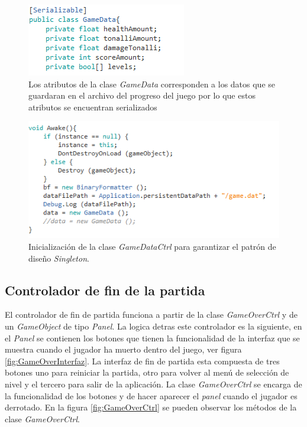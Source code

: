 	\begin{figure}[h]
		\centering
		\includegraphics[height=0.15 \textheight]{03TrabajoRealizado/imagenes/GameData.png}
		\caption{Los atributos de la clase \textit{GameData} corresponden a los 
		datos que se guardaran en el archivo del progreso del juego por lo que 
		estos atributos se encuentran serializados}
		\label{fig:GameData}
	\end{figure}   
	
	\begin{figure}[h]
		\centering
		\includegraphics[height=0.2 \textheight]{03TrabajoRealizado/imagenes/gameDataCtrl.png}
		\caption{Inicialización de la clase \textit{GameDataCtrl} para 
		garantizar el patrón de diseño \textit{Singleton}.}
		\label{fig:GameDataCtrl}
	\end{figure}

\subsection{Controlador de fin de la partida}
El controlador de fin de partida funciona a partir de la clase 
\textit{GameOverCtrl} y de un \textit{GameObject} de tipo \textit{Panel}. La 
logica detras este controlador es la siguiente, en el \textit{Panel} se 
contienen los botones que tienen la funcionalidad de la interfaz que se muestra 
cuando el jugador ha muerto dentro del juego, ver figura 
\ref{fig:GameOverInterfaz}. La interfaz de fin de partida esta compuesta de tres 
botones uno para reiniciar la partida, otro para volver al menú de selección de 
nivel y el tercero para salir de la aplicación. La clase \textit{GameOverCtrl} 
se encarga de la funcionalidad de los botones y de hacer aparecer el 
\textit{panel} cuando el jugador es derrotado. En la figura 
\ref{fig:GameOverCtrl} se pueden observar los métodos de la clase \textit{GameOverCtrl}. 

